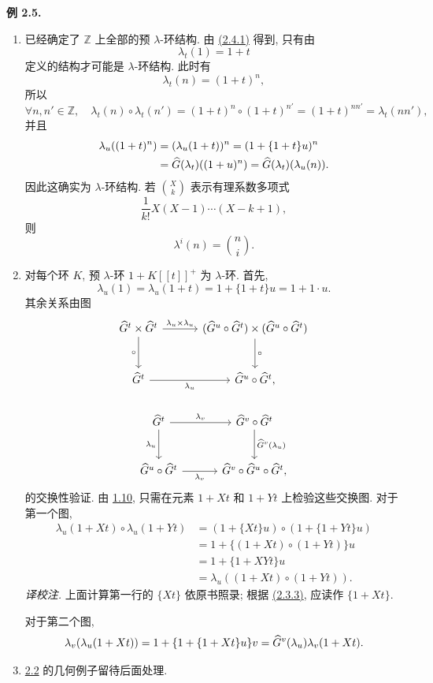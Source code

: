 \textbf{例 2.5.}
\begin{enumerate}[label=\alph*)]
\item 已经确定了 \(\mathbb Z\) 上全部的预 \(\lambda\)-环结构. 由 \hyperlink{sga6.e05.eq.2-4-1}{(2.4.1)} 得到, 只有由
\[
  \lambda_t(1)=1+t
\]
定义的结构才可能是 \(\lambda\)-环结构. 此时有
\[
  \lambda_t(n)=(1+t)^n,
\]
所以
\[
  \forall n,n'\in\mathbb Z,\quad
  \lambda_t(n)\circ\lambda_t(n')=(1+t)^n\circ(1+t)^{n'}
  =(1+t)^{nn'}=\lambda_t(nn'),
\]
并且
\[
\begin{aligned}
  \lambda_u((1+t)^n)
  &=(\lambda_u(1+t))^n=(1+\{1+t\}u)^n\\
  &=\widehat G(\lambda_t)((1+u)^n)
   =\widehat G(\lambda_t)(\lambda_u(n)).
\end{aligned}
\]
因此这确实为 \(\lambda\)-环结构. 若 \(\binom{X}{k}\) 表示有理系数多项式
\[
  \frac{1}{k!}X(X-1)\cdots(X-k+1),
\]
则
\begin{equation}\tag{2.5.1}
  \lambda^i(n)=\binom{n}{i}.
\end{equation}

\item 对每个环 \(K\), 预 \(\lambda\)-环 \(1+K[[t]]^+\) 为 \(\lambda\)-环. 首先,
\[
  \lambda_u(1)=\lambda_u(1+t)=1+\{1+t\}u=1+1\cdot u.
\]
其余关系由图
\[
\begin{gathered}
\begin{tikzcd}[column sep=3.2em,row sep=large]
\Ghat^t\times\Ghat^t \arrow[r,"\lambda_u\times\lambda_u"] \arrow[d,"\circ"'] &
(\Ghat^u\circ\Ghat^t)\times(\Ghat^u\circ\Ghat^t) \arrow[d,"\circ"]\\
\Ghat^t \arrow[r,"\lambda_u"'] &
\Ghat^u\circ\Ghat^t,
\end{tikzcd}\\[1.3em]
\begin{tikzcd}[column sep=3.2em,row sep=large]
\Ghat^t \arrow[r,"\lambda_v"] \arrow[d,"\lambda_u"'] &
\Ghat^v\circ\Ghat^t \arrow[d,"\Ghat^v(\lambda_u)"]\\
\Ghat^u\circ\Ghat^t \arrow[r,"\lambda_v"'] &
\Ghat^v\circ\Ghat^u\circ\Ghat^t,
\end{tikzcd}
\end{gathered}
\]
的交换性验证. 由 \hyperlink{sga6.e05.thm.1-10}{1.10}, 只需在元素 \(1+Xt\) 和 \(1+Yt\) 上检验这些交换图. 对于第一个图,
\[
\begin{aligned}
\lambda_u(1+Xt)\circ\lambda_u(1+Yt)
&=(1+\{Xt\}u)\circ(1+\{1+Yt\}u)\\
&=1+\{(1+Xt)\circ(1+Yt)\}u\\
&=1+\{1+XYt\}u\\
&=\lambda_u((1+Xt)\circ(1+Yt)).
\end{aligned}
\]
\emph{译校注.} 上面计算第一行的 \(\{Xt\}\) 依原书照录; 根据 \hyperlink{sga6.e05.eq.2-3-3}{(2.3.3)}, 应读作 \(\{1+Xt\}\).

对于第二个图,
\[
  \lambda_v(\lambda_u(1+Xt))
  =
  1+\{1+\{1+Xt\}u\}v
  =
  \widehat G^v(\lambda_u)\lambda_v(1+Xt).
\]

\item \hyperlink{sga6.e05.ex.2-2}{2.2} 的几何例子留待后面处理.
\end{enumerate}

